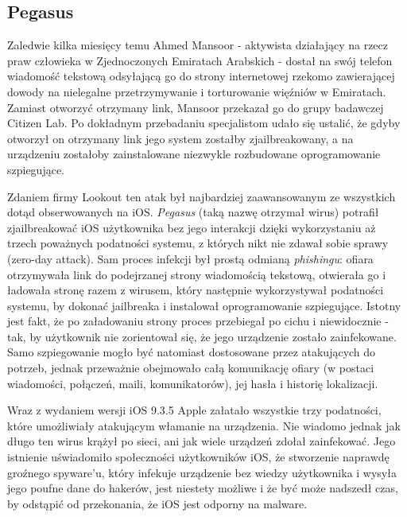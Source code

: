 \documentclass[polish]{kbk}
\begin{document}
\subsection{Pegasus \cite{pegasus}}
Zaledwie kilka miesięcy temu Ahmed Mansoor - aktywista działający na rzecz praw człowieka w Zjednoczonych Emiratach Arabskich - dostał na swój telefon wiadomość tekstową odsyłającą go do strony internetowej rzekomo zawierającej dowody na nielegalne przetrzymywanie i torturowanie więźniów w Emiratach. Zamiast otworzyć otrzymany link, Mansoor przekazał go do grupy badawczej Citizen Lab. Po dokładnym przebadaniu specjalistom udało się ustalić, że gdyby otworzył on otrzymany link jego system zostałby zjailbreakowany, a na urządzeniu zostałoby zainstalowane niezwykle rozbudowane oprogramowanie szpiegujące. 

Zdaniem firmy Lookout ten atak był najbardziej zaawansowanym ze wszystkich dotąd obserwowanych na iOS. \textit{Pegasus} (taką nazwę otrzymał wirus) potrafił zjailbreakować iOS użytkownika bez jego interakcji dzięki wykorzystaniu aż trzech poważnych podatności systemu, z których nikt nie zdawał sobie sprawy (zero-day attack). Sam proces infekcji był prostą odmianą \textit{phishingu}: ofiara otrzymywała link do podejrzanej strony wiadomością tekstową, otwierała go i ładowała stronę razem z wirusem, który następnie wykorzystywał podatności systemu, by dokonać jailbreaka i instalował oprogramowanie szpiegujące. Istotny jest fakt, że po załadowaniu strony proces przebiegał po cichu i niewidocznie - tak, by użytkownik nie zorientował się, że jego urządzenie zostało zainfekowane. Samo szpiegowanie mogło być natomiast dostosowane przez atakujących do potrzeb, jednak przeważnie obejmowało całą komunikację ofiary (w postaci wiadomości, połączeń, maili, komunikatorów), jej hasła i historię lokalizacji.

Wraz z wydaniem wersji iOS 9.3.5 Apple załatało wszystkie trzy podatności, które umożliwiały atakującym włamanie na urządzenia. Nie wiadomo jednak jak długo ten wirus krążył po sieci, ani jak wiele urządzeń zdołał zainfekować. Jego istnienie uświadomiło społeczności użytkowników iOS, że stworzenie naprawdę groźnego spyware'u, który infekuje urządzenie bez wiedzy użytkownika i wysyła jego poufne dane do hakerów, jest niestety możliwe i że być może nadszedł czas, by odstąpić od przekonania, że iOS jest odporny na malware.
\end{document}

